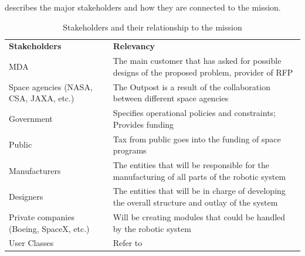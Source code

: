 \documentclass[12pt, letter]{article}
\begin{document}
 describes the major stakeholders and how they are connected to the mission.
\begin{table}[H]
\caption{Stakeholders and their relationship to the mission}
\label{stakeholders}
\begin{tabular}{|P{5.2cm}|P{10.8cm}|}
\hline
\textbf{Stakeholders}	&	\textbf{Relevancy}	\\\hhline{|=|=|}
MDA				&	The main customer that has asked for possible designs of the proposed problem, provider of RFP	\\\hline
Space agencies (NASA, CSA, JAXA, etc.)	&	The Outpost is a result of the collaboration between different space agencies	\\\hline
Government		&	Specifies operational policies and constraints; Provides funding							\\\hline
Public			&	Tax from public goes into the funding of space programs								\\\hline
Manufacturers		&	The entities that will be responsible for the manufacturing of all parts of the robotic system		\\\hline
Designers			&	The entities that will be in charge of developing the overall structure and outlay of the system		\\\hline
Private companies (Boeing, SpaceX, etc.)	&	Will be creating modules that could be handled by the robotic system		\\\hline
User Classes		&	Refer to 															\\\hline
\end{tabular}
\end{table}

\end{document}
